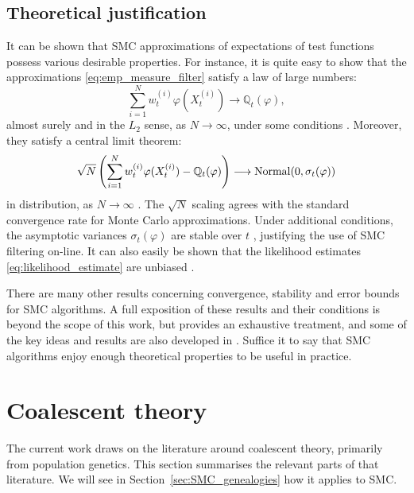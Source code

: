 \subsection{Theoretical justification}
\label{sec:SMC_theory}
It can be shown that SMC approximations of expectations of test functions possess various desirable properties. For instance, it is quite easy to show that the approximations \eqref{eq:emp_measure_filter} satisfy a law of large numbers:
\begin{equation*}
\sum_{i=1}^N w_t^{(i)} \varphi( X_t^{(i)} ) 
\longrightarrow \mathbb{Q}_t(\varphi) ,
\end{equation*}
almost surely and in the $L_2$ sense, as $N\to\infty$, under some conditions \parencite{crisan2002}.
Moreover, they satisfy a central limit theorem:
\begin{equation*}
\sqrt{N} \left( \sum_{i=1}^N w_t^{(i)} \varphi( X_t^{(i)} ) - \mathbb{Q}_t(\varphi) \right)
\longrightarrow  \operatorname{Normal}( 0, \sigma_t(\varphi) )
\end{equation*}
in distribution, as $N\to\infty$ \parencite{delmoral1999, chopin2004}. 
The $\sqrt{N}$ scaling agrees with the standard convergence rate for Monte Carlo approximations.
Under additional conditions, the asymptotic variances $\sigma_t(\varphi)$ are stable over $t$ \parencite[e.g.][Proposition 11.13]{chopin2020}, justifying the use of SMC filtering on-line.
It can also easily be shown that the likelihood estimates \eqref{eq:likelihood_estimate} are unbiased \parencite[see for example][Proposition 16.3]{chopin2020}.

There are many other results concerning convergence, stability and error bounds for SMC algorithms. A full exposition of these results and their conditions is beyond the scope of this work, but \textcite{delmoral2004, delmoral2013} provides an exhaustive treatment, and some of the key ideas and results are also developed in \textcite[Chapter 11]{chopin2020}.
Suffice it to say that SMC algorithms enjoy enough theoretical properties to be useful in practice.





\section{Coalescent theory}
\label{sec:coaltheory}
The current work draws on the literature around coalescent theory, primarily from population genetics. This section summarises the relevant parts of that literature. We will see in Section~\ref{sec:SMC_genealogies} how it applies to SMC.

